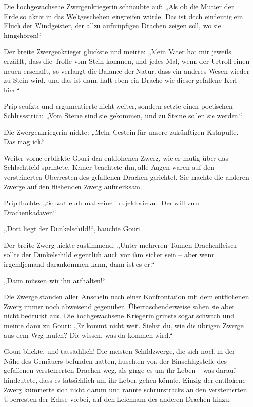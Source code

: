 \documentclass[10pt, a4paper, oneside]{book}
\begin{document}
Die hochgewachsene Zwergenkriegerin schnaubte auf: „Als ob die Mutter der Erde so aktiv in das Weltgeschehen eingreifen würde. Das ist doch eindeutig ein Fluch der Windgeister, der allzu aufmüpfigen Drachen zeigen soll, wo sie hingehören!“

Der breite Zwergenkrieger gluckste und meinte: „Mein Vater hat mir jeweils erzählt, dass die Trolle vom Stein kommen, und jedes Mal, wenn der Urtroll einen neuen erschafft, so verlangt die Balance der Natur, dass ein anderes Wesen wieder zu Stein wird, und das ist dann halt eben ein Drache wie dieser gefallene Kerl hier.“

Prip seufzte und argumentierte nicht weiter, sondern setzte einen poetischen Schlussstrich: „Vom Steine sind sie gekommen, und zu Steine sollen sie werden.“

Die Zwergenkriegerin nickte: „Mehr Gestein für unsere zukünftigen Katapulte. Das mag ich.“

Weiter vorne erblickte Gouri den entflohenen Zwerg, wie er mutig über das Schlachtfeld sprintete. Keiner beachtete ihn, alle Augen waren auf den versteinerten Überresten des gefallenen Drachen gerichtet. Sie machte die anderen Zwerge auf den fliehenden Zwerg aufmerksam.

Prip fluchte: „Schaut euch mal seine Trajektorie an. Der will zum Drachenkadaver.“

„Dort liegt der Dunkelschild!“, hauchte Gouri.

Der breite Zwerg nickte zustimmend: „Unter mehreren Tonnen Drachenfleisch sollte der Dunkelschild eigentlich auch vor ihm sicher sein – aber wenn irgendjemand darankommen kann, dann ist es er.“

„Dann müssen wir ihn aufhalten!“

Die Zwerge standen allen Anschein nach einer Konfrontation mit dem entflohenen Zwerg immer noch abweisend gegenüber. Überraschenderweise sahen sie aber nicht bedrückt aus. Die hochgewachsene Kriegerin grinste sogar schwach und meinte dann zu Gouri: „Er kommt nicht weit. Siehst du, wie die übrigen Zwerge aus dem Weg laufen? Die wissen, was da kommen wird.“

Gouri blickte, und tatsächlich! Die meisten Schildzwerge, die sich noch in der Nähe des Gemäuers befunden hatten, huschten von der Einschlagstelle des gefallenen versteinerten Drachen weg, als ginge es um ihr Leben – was darauf hindeutete, dass es tatsächlich um ihr Leben gehen könnte. Einzig der entflohene Zwerg kümmerte sich nicht darum und rannte schnurstracks an den versteinerten Überresten der Echse vorbei, auf den Leichnam des anderen Drachen hinzu.
\end{document}
